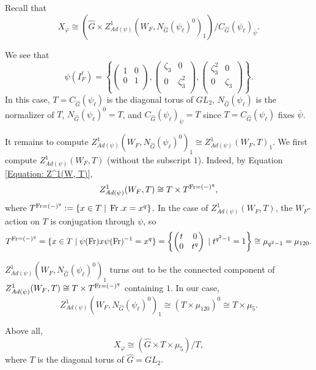 \begin{eg}
    Recall that
    $$X_{\varphi} \cong (\hat{G} \times Z^1_{Ad(\psi)}(W_F, N_{\hat{G}}(\psi_{\ell})^0)_1)/C_{\hat{G}}(\psi_{\ell})_{\overline{\psi}}.$$
    
    We see that 
    $$\psi(I_F^{\ell})=\left\{
    \begin{pmatrix}
    	1 & 0 \\
    	0 & 1 \\
    \end{pmatrix},
    \begin{pmatrix}
    	\zeta_3 & 0 \\
    	0 & \zeta_3^2 \\
    \end{pmatrix},
    \begin{pmatrix}
    	\zeta_3^2 & 0 \\
    	0 & \zeta_3 \\
    \end{pmatrix}
    \right\}.$$ 
    In this case, $T=C_{\hat{G}}(\psi_{\ell})$ is the diagonal torus of $GL_2$, $N_{\hat{G}}(\psi_{\ell})$ is the normalizer of $T$, $N_{\hat{G}}(\psi_{\ell})^0=T$, and $C_{\hat{G}}(\psi_{\ell})_{\overline{\psi}}=T$ since $T=C_{\hat{G}}(\psi_{\ell})$ fixes $\overline{\psi}$.
    
    It remains to compute $Z^1_{Ad(\psi)}(W_F, N_{\hat{G}}(\psi_{\ell})^0)_1 \cong Z^1_{Ad(\psi)}(W_F, T)_1$. We first compute $Z^1_{Ad(\psi)}(W_F, T)$ (without the subscript $1$). Indeed, by Equation \eqref{Equation: Z^1(W, T)}, 
    $$Z^1_{Ad(\psi)}(W_F, T) \cong T \times T^{\operatorname{Fr}=(-)^q},$$
    where $T^{\operatorname{Fr}=(-)^q}:=\{x \in T \;|\; \operatorname{Fr}.x=x^q\}$.
    In the case of $Z^1_{Ad(\psi)}(W_F, T)$, the $W_F$-action on $T$ is conjugation through $\psi$, so 
    $$T^{\operatorname{Fr}=(-)^q}=\{x \in T \;|\; \psi(\operatorname{Fr})x\psi(\operatorname{Fr})^{-1}=x^q\}
    =\left\{\begin{pmatrix}
    	t & 0 \\
    	0 & t^q \\
    \end{pmatrix} \;|\; t^{q^2-1}=1\right\}
    \cong \mu_{q^2-1}=\mu_{120}.$$
    
    $Z^1_{Ad(\psi)}(W_F, N_{\hat{G}}(\psi_{\ell})^0)_1$ turns out to be the connected component of $Z^1_{Ad(\psi)}(W_F, T) \cong T \times T^{\operatorname{Fr}=(-)^q}$ containing $1$. In our case,
    $$Z^1_{Ad(\psi)}(W_F, N_{\hat{G}}(\psi_{\ell})^0)_1 \cong (T \times \mu_{120})^0 \cong T \times \mu_5.$$
    
    Above all, 
    $$X_{\varphi} \cong (\hat{G} \times T \times \mu_5)/T,$$
    where $T$ is the diagonal torus of $\hat{G}=GL_2$.
    
    
     
\end{eg}

